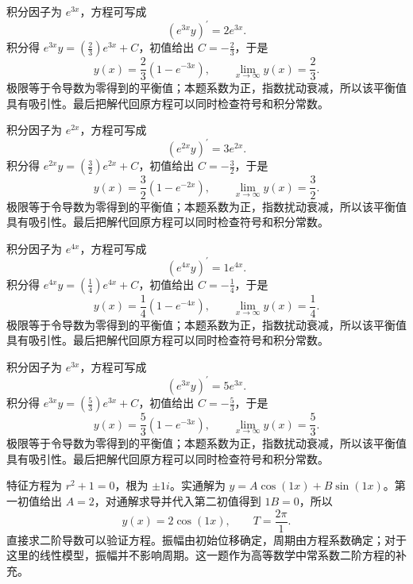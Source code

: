 \documentclass[12pt,fontset=fandol]{ctexart}
\begin{document}
\begin{solve}\label{ans:c22q15}
积分因子为 $e^{3x}$，方程可写成
\[
\left(e^{3x}y\right)^{\prime}=2e^{3x}.
\]
积分得 $e^{3x}y=(\frac{2}{3})e^{3x}+C$，初值给出 $C=-\frac{2}{3}$，于是
\[
y(x)=\frac{2}{3}(1-e^{-3x}),\qquad\lim_{x\to\infty}y(x)=\frac{2}{3}.
\]
极限等于令导数为零得到的平衡值；本题系数为正，指数扰动衰减，所以该平衡值具有吸引性。最后把解代回原方程可以同时检查符号和积分常数。
\end{solve}

\begin{solve}\label{ans:c22q16}
积分因子为 $e^{2x}$，方程可写成
\[
\left(e^{2x}y\right)^{\prime}=3e^{2x}.
\]
积分得 $e^{2x}y=(\frac{3}{2})e^{2x}+C$，初值给出 $C=-\frac{3}{2}$，于是
\[
y(x)=\frac{3}{2}(1-e^{-2x}),\qquad\lim_{x\to\infty}y(x)=\frac{3}{2}.
\]
极限等于令导数为零得到的平衡值；本题系数为正，指数扰动衰减，所以该平衡值具有吸引性。最后把解代回原方程可以同时检查符号和积分常数。
\end{solve}

\begin{solve}\label{ans:c22q17}
积分因子为 $e^{4x}$，方程可写成
\[
\left(e^{4x}y\right)^{\prime}=1e^{4x}.
\]
积分得 $e^{4x}y=(\frac{1}{4})e^{4x}+C$，初值给出 $C=-\frac{1}{4}$，于是
\[
y(x)=\frac{1}{4}(1-e^{-4x}),\qquad\lim_{x\to\infty}y(x)=\frac{1}{4}.
\]
极限等于令导数为零得到的平衡值；本题系数为正，指数扰动衰减，所以该平衡值具有吸引性。最后把解代回原方程可以同时检查符号和积分常数。
\end{solve}

\begin{solve}\label{ans:c22q18}
积分因子为 $e^{3x}$，方程可写成
\[
\left(e^{3x}y\right)^{\prime}=5e^{3x}.
\]
积分得 $e^{3x}y=(\frac{5}{3})e^{3x}+C$，初值给出 $C=-\frac{5}{3}$，于是
\[
y(x)=\frac{5}{3}(1-e^{-3x}),\qquad\lim_{x\to\infty}y(x)=\frac{5}{3}.
\]
极限等于令导数为零得到的平衡值；本题系数为正，指数扰动衰减，所以该平衡值具有吸引性。最后把解代回原方程可以同时检查符号和积分常数。
\end{solve}

\begin{solve}\label{ans:c22q19}
特征方程为 $r^2+1=0$，根为 $\pm 1i$。实通解为 $y=A\cos(1x)+B\sin(1x)$。第一初值给出 $A=2$，对通解求导并代入第二初值得到 $1B=0$，所以
\[
y(x)=2\cos(1x),\qquad T=\frac{2\pi}{1}.
\]
直接求二阶导数可以验证方程。振幅由初始位移确定，周期由方程系数确定；对于这里的线性模型，振幅并不影响周期。这一题作为高等数学中常系数二阶方程的补充。
\end{solve}
\end{document}
